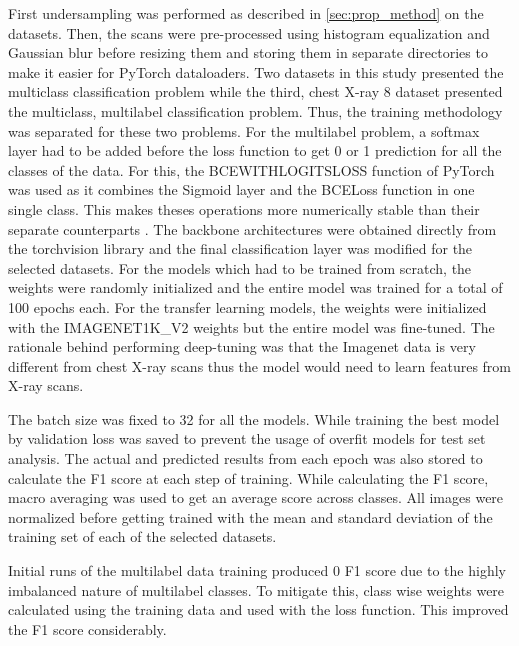 \documentclass[10pt,twocolumn,letterpaper]{article}
\begin{document}
First undersampling was performed as described in \cref{sec:prop_method} on the datasets. Then,
the scans were pre-processed using histogram equalization and Gaussian blur before resizing them 
and storing them in separate directories to make it easier for PyTorch dataloaders. 
Two datasets in this study presented the multiclass classification problem while the third, 
chest X-ray 8 dataset presented the multiclass, multilabel classification problem. Thus, the 
training methodology was separated for these two problems. For the multilabel problem, 
a softmax layer had to be added before the loss function to get 0 or 1 prediction for 
all the classes of the data. For this, the BCEWITHLOGITSLOSS function of PyTorch was used 
as it combines the Sigmoid layer and the BCELoss function in one single class. This makes 
theses operations more numerically stable than their separate counterparts \cite{bcelogits}.
The backbone architectures were obtained directly from the torchvision library and the final 
classification layer was modified for the selected datasets. For the models which had to be 
trained from scratch, the weights were randomly initialized and the entire model was trained 
for a total of 100 epochs each. For the transfer learning models, the weights were initialized 
with the IMAGENET1K\_V2 weights but the entire model was fine-tuned. The rationale behind 
performing deep-tuning was that the Imagenet data is very different from chest X-ray scans 
thus the model would need to learn features from X-ray scans. 

The batch size was fixed to 32 for all the models. 
While training the best model by validation loss was saved to prevent the usage of overfit 
models for test set analysis. The actual and predicted results from each epoch was also stored 
to calculate the F1 score at each step of training. While calculating the F1 score, macro averaging 
was used to get an average score across classes. All images were normalized before getting trained 
with the mean and standard deviation of the training set of each of the selected datasets.

Initial runs of the multilabel data training produced 0 F1 score due to the highly imbalanced 
nature of multilabel classes. To mitigate this, class wise weights were calculated using the training 
data and used with the loss function. This improved the F1 score considerably. 
\end{document}
